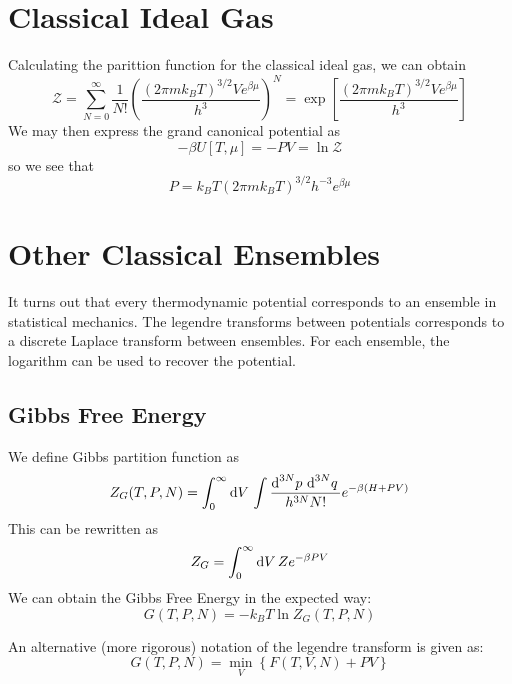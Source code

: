 \section{Classical Ideal Gas}
Calculating the parittion function for the classical ideal gas, we can obtain
\[\mathcal Z = \sum_{N=0}^\infty \frac{1}{N!}\left(\frac{(2\pi mk_BT)^{3/2}Ve^{\beta \mu}}{h^3}\right)^N = \exp\left[\frac{(2\pi m k_B T)^{3/2} V e^{\beta \mu}}{h^3}\right]\]
We may then express the grand canonical potential as
\[-\beta U[T,\mu] = -PV = \ln \mathcal Z\]
so we see that
\[P= k_BT(2\pi mk_BT)^{3/2}h^{-3}e^{\beta\mu}\]

\section{Other Classical Ensembles}
It turns out that every thermodynamic potential corresponds to an ensemble in statistical mechanics. The legendre transforms between potentials corresponds to a discrete Laplace transform between ensembles. For each ensemble, the logarithm can be used to recover the potential.

\subsection{Gibbs Free Energy}
We define Gibbs partition function as
\begin{equation}
	Z_G(T,P,N) = \int_0^\infty\d{V}\int\frac{\d[3N]{p}\d[3N]{q}}{h^{3N}N!}e^{-\beta(H+PV)}
\end{equation}
This can be rewritten as
\[Z_G = \int_0^\infty\d{V} Z e^{-\beta PV}\]
We can obtain the Gibbs Free Energy in the expected way:
\[G(T,P,N) = -k_BT\ln Z_G(T,P,N)\]

\begin{aside}
	An alternative (more rigorous) notation of the legendre transform is given as:
	\[G(T,P,N) = \min_{V}\left\{F(T, V, N)+PV\right\}\]
\end{aside}
